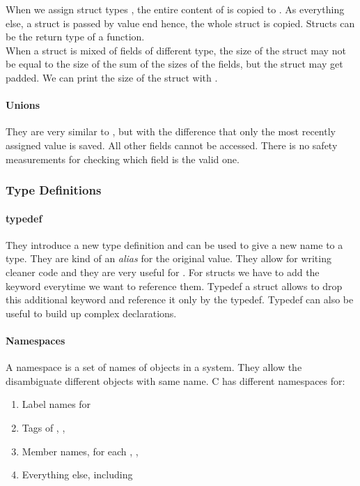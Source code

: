 When we assign struct types , the entire content of  is copied to . As everything else, a struct is passed by value end hence, the whole struct is copied. Structs can be the return type of a function.\\
When a struct is mixed of fields of different type, the size of the struct may not be equal to the size of the sum of the sizes of the fields, but the struct may get padded. We can print the size of the struct with .

\paragraph{Unions}
They are very similar to , but with the difference that only the most recently assigned value is saved. All other fields cannot be accessed. There is no safety measurements for checking which field is the valid one.

\subsubsection{Type Definitions}
\paragraph{typedef}
They introduce a new type definition and can be used to give a new name to a type. They are kind of an \textit{alias} for the original value. They allow for writing cleaner code and they are very useful for . For structs we have to add the  keyword everytime we want to reference them. Typedef a struct allows to drop this additional keyword and reference it only by the typedef. Typedef can also be useful to build up complex declarations.

\paragraph{Namespaces}
A namespace is a set of names of objects in a system. They allow the disambiguate different objects with same name. C has different namespaces for:
\begin{enumerate}
    \item Label names for 
    \item Tags of , , 
    \item Member names, for each , , 
    \item Everything else, including 
\end{enumerate}

